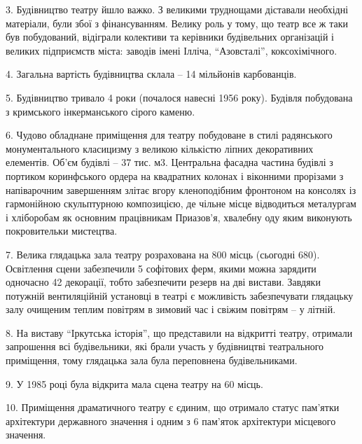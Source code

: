 3. Будівництво театру йшло важко. З великими труднощами діставали необхідні
матеріали, були збої з фінансуванням. Велику роль у тому, що театр все ж таки
був побудований, відіграли колективи та керівники будівельних організацій і
великих підприємств міста: заводів імені Ілліча, \enquote{Азовсталі}, коксохімічного.

4. Загальна вартість будівництва склала – 14 мільйонів карбованців.

5. Будівництво тривало 4 роки (почалося навесні 1956 року). Будівля побудована
з кримського інкерманського сірого каменю.


6. Чудово обладнане приміщення для театру побудоване в стилі радянського
монументального класицизму з великою кількістю ліпних декоративних елементів.
Об'єм будівлі – 37 тис. м3. Центральна фасадна частина будівлі з портиком
коринфського ордера на квадратних колонах і віконними прорізами з напіварочним
завершенням злітає вгору кленоподібним фронтоном на консолях із гармонійною
скульптурною композицією, де чільне місце відводиться металургам і хліборобам
як основним працівникам Приазов'я, хвалебну оду яким виконують покровительки
мистецтва.

7. Велика глядацька зала театру розрахована на 800 місць (сьогодні 680).
Освітлення сцени забезпечили 5 софітових ферм, якими можна зарядити одночасно
42 декорації, тобто забезпечити резерв на дві вистави. Завдяки потужній
вентиляційній установці в театрі є можливість забезпечувати глядацьку залу
очищеним теплим повітрям в зимовий час і свіжим повітрям – у літній.


8. На виставу \enquote{Іркутська історія}, що представили на відкритті театру, отримали
запрошення всі будівельники, які брали участь у будівництві театрального
приміщення, тому глядацька зала була переповнена будівельниками.

9. У 1985 році була відкрита мала сцена театру на 60 місць.

10.  Приміщення драматичного театру є єдиним, що отримало статус пам'ятки
архітектури державного значення і одним з 6 пам'яток архітектури місцевого
значення.


